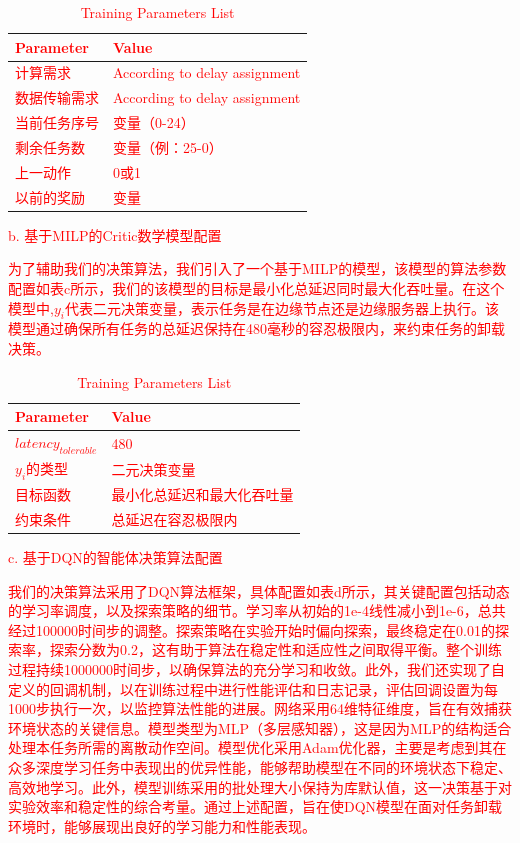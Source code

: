 \documentclass[preprint,12pt]{elsarticle}
\begin{document}
\textcolor{red}{
\begin{table}[hbt]
    \begin{tabularx}{\textwidth} {m{}<{\raggedright}m{}<{\raggedright}}
    \hline
    \textbf{Parameter} & \textbf{Value} \\
    \hline
    计算需求 & According to delay assignment\\
    数据传输需求 & According to delay assignment\\
    当前任务序号 & 变量（0-24）\\
    剩余任务数 & 变量（例：25-0）\\
    上一动作 & 0或1\\
    以前的奖励 & 变量\\
    \hline
    \end{tabularx}
    \caption{Training Parameters List}
\end{table}}

\textcolor{red}{b.	基于MILP的Critic数学模型配置}

\textcolor{red}{为了辅助我们的决策算法，我们引入了一个基于MILP的模型，该模型的算法参数配置如表c所示，我们的该模型的目标是最小化总延迟同时最大化吞吐量。在这个模型中,\(y_i\)代表二元决策变量，表示任务是在边缘节点还是边缘服务器上执行。该模型通过确保所有任务的总延迟保持在480毫秒的容忍极限内，来约束任务的卸载决策。}

\textcolor{red}{
\begin{table}[hbt]
    \begin{tabularx}{\textwidth} {m{}<{\raggedright}m{}<{\raggedright}}
    \hline
    \textbf{Parameter} & \textbf{Value} \\
    \hline
    $latency_{tolerable}$ & 480\\
    $y_i$的类型 & 二元决策变量\\
    目标函数 & 最小化总延迟和最大化吞吐量\\
    约束条件 & 总延迟在容忍极限内\\
    \hline
    \end{tabularx}
    \caption{Training Parameters List}
\end{table}}

\textcolor{red}{c.	基于DQN的智能体决策算法配置}

\textcolor{red}{我们的决策算法采用了DQN算法框架，具体配置如表d所示，其关键配置包括动态的学习率调度，以及探索策略的细节。学习率从初始的1e-4线性减小到1e-6，总共经过100000时间步的调整。探索策略在实验开始时偏向探索，最终稳定在0.01的探索率，探索分数为0.2，这有助于算法在稳定性和适应性之间取得平衡。整个训练过程持续1000000时间步，以确保算法的充分学习和收敛。此外，我们还实现了自定义的回调机制，以在训练过程中进行性能评估和日志记录，评估回调设置为每1000步执行一次，以监控算法性能的进展。网络采用64维特征维度，旨在有效捕获环境状态的关键信息。模型类型为MLP（多层感知器），这是因为MLP的结构适合处理本任务所需的离散动作空间。模型优化采用Adam优化器，主要是考虑到其在众多深度学习任务中表现出的优异性能，能够帮助模型在不同的环境状态下稳定、高效地学习。此外，模型训练采用的批处理大小保持为库默认值，这一决策基于对实验效率和稳定性的综合考量。通过上述配置，旨在使DQN模型在面对任务卸载环境时，能够展现出良好的学习能力和性能表现。}
\end{document}
